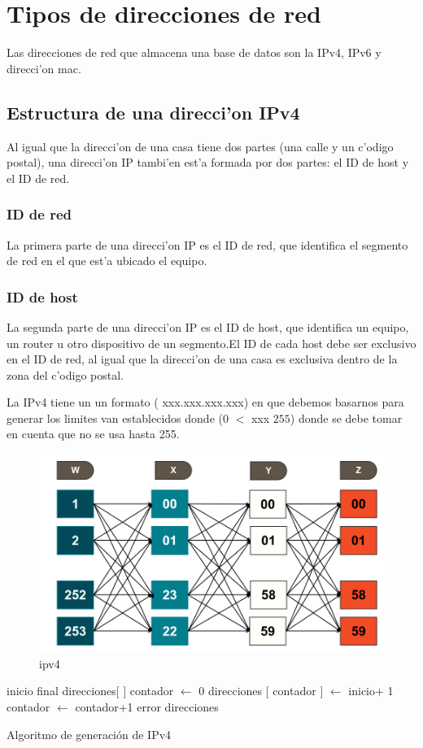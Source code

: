 \section{Tipos de direcciones de red}
Las direcciones de red que almacena una base de datos son la IPv4, IPv6 y direcci'on mac.
\subsection{Estructura de una direcci'on IPv4}
Al igual que la direcci'on de una casa tiene dos partes (una calle y un c'odigo postal), una direcci'on IP tambi'en est'a formada por dos partes: el ID de host y el ID de red.
\subsubsection{ID de red}
La primera parte de una direcci'on IP es el ID de red, que identifica el segmento de red en el que est'a ubicado el equipo.
\subsubsection{ID de host}
La segunda parte de una direcci'on IP es el ID de host, que identifica un equipo, un router u otro dispositivo de un segmento.El ID de cada host debe ser exclusivo en el ID de red, al igual que la direcci'on de una casa es exclusiva dentro de la zona del c'odigo postal.

La IPv4 tiene un un formato ( xxx.xxx.xxx.xxx) en que debemos basarnos para generar los limites van establecidos donde (0 $<$ xxx $255$) donde se debe tomar en cuenta que no se usa hasta 255.  
\begin{figure}[H]
\centering
\includegraphics[scale=0.4]{images/ipv4.png}
\caption{ipv4}
\end{figure}
\begin{algorithm}[H]
\begin{algorithmic}[1]
\REQUIRE inicio final
\STATE direcciones$[$ $]$
\STATE contador $\leftarrow$ 0
	\STATE direcciones $[$ contador $]$ $\leftarrow$ inicio+ 1
	\STATE contador $\leftarrow$ contador+1
	\ENDWHILE
\ELSE
	\RETURN error
\ENDIF
\RETURN direcciones
\end{algorithmic}
\caption{Algoritmo de generaci\'on de IPv4}\label{alg:algoritmoGeneracionIPv4}
\end{algorithm}